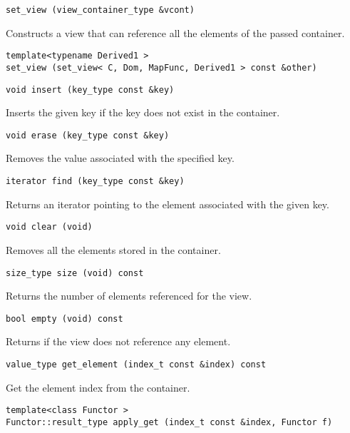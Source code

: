 \begin{verbatim}
set_view (view_container_type &vcont)
\end{verbatim}

Constructs a view that can reference all the elements of the passed container.

\begin{verbatim}
template<typename Derived1 >
set_view (set_view< C, Dom, MapFunc, Derived1 > const &other)
\end{verbatim}

\begin{verbatim}
void insert (key_type const &key)
\end{verbatim}

Inserts the given key if the key does not exist in the container.

\begin{verbatim}
void erase (key_type const &key)
\end{verbatim}

Removes the value associated with the specified key.

\begin{verbatim}
iterator find (key_type const &key)
\end{verbatim}

Returns an iterator pointing to the element associated with the given key.

\begin{verbatim}
void clear (void)
\end{verbatim}

Removes all the elements stored in the container.

\begin{verbatim}
size_type size (void) const
\end{verbatim}

Returns the number of elements referenced for the view.

\begin{verbatim}
bool empty (void) const
\end{verbatim}

Returns if the view does not reference any element.

\begin{verbatim}
value_type get_element (index_t const &index) const
\end{verbatim}

Get the element index from the container.

\begin{verbatim}
template<class Functor >
Functor::result_type apply_get (index_t const &index, Functor f)
\end{verbatim}

